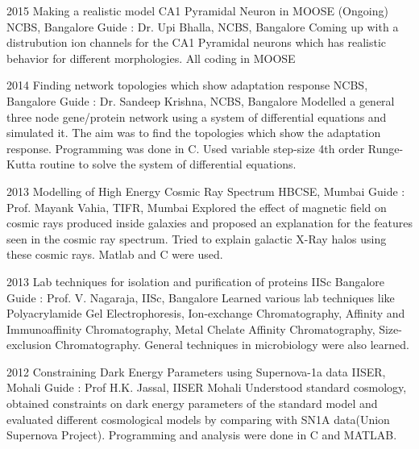 \documentclass[11pt]{friggeri-cv}%
\begin{document}
\begin{entrylist}
  \entry
    {2015}
    {Making a realistic model CA1 Pyramidal Neuron in MOOSE (Ongoing)}
    {NCBS, Bangalore}
    {Guide : Dr. Upi Bhalla, NCBS, Bangalore}
    {Coming up with a distrubution ion channels for the CA1 Pyramidal neurons which has realistic behavior for different morphologies. All coding in MOOSE}
\end{entrylist}
\begin{entrylist}
  \entry
    {2014}
    {Finding network topologies which show adaptation response}
    {NCBS, Bangalore}
    {Guide : Dr. Sandeep Krishna, NCBS, Bangalore}
    {Modelled a general three node gene/protein network using a system of differential equations and simulated it. The aim was to find the topologies which show the adaptation response. Programming was done in C. Used variable step-size 4th order Runge-Kutta routine to solve the system of differential equations.}
\end{entrylist}
\begin{entrylist}

  \entry
    {2013}
    {Modelling of High Energy Cosmic Ray Spectrum}
    {HBCSE, Mumbai}
    {Guide : Prof. Mayank Vahia, TIFR, Mumbai}
    {Explored the effect of magnetic field on cosmic rays produced inside galaxies and proposed an explanation for the features seen in the cosmic ray spectrum. Tried to explain galactic X-Ray halos using these cosmic rays. Matlab and C were used.
    }
\end{entrylist}
\begin{entrylist}
    
  \entry
    {2013}
    {Lab techniques for isolation and purification of proteins}
    {IISc Bangalore}
    {
    Guide : Prof. V. Nagaraja, IISc, Bangalore}
    {Learned various lab techniques like Polyacrylamide Gel Electrophoresis, Ion-exchange Chromatography, Affinity and Immunoaffinity Chromatography, Metal Chelate Affinity Chromatography,  Size-exclusion Chromatography. General techniques in microbiology were also learned.
    }    
\end{entrylist}
\begin{entrylist}

  \entry
    {2012}
    {Constraining Dark Energy Parameters using Supernova-1a data}
    {IISER, Mohali}
    {Guide : Prof H.K. Jassal, IISER Mohali}
    {Understood standard cosmology,  obtained constraints on dark energy parameters of the standard model and evaluated different cosmological models by comparing with SN1A data(Union Supernova Project). Programming and analysis were done in C and MATLAB.
    }
    
\end{entrylist}
\end{document}
